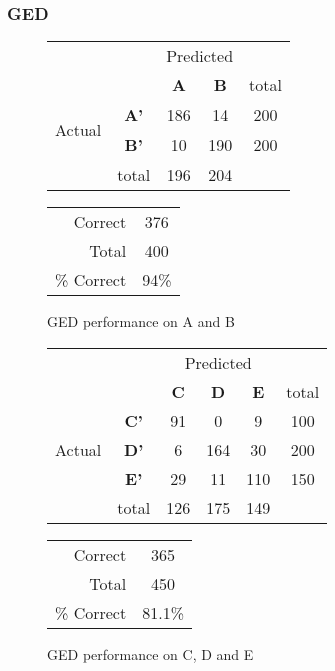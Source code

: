\subsubsection{GED}
\begin{figure}[ht]
\begin{minipage}[b]{0.5\linewidth}
\centering
	\begin{tabular}{ccc|c|c}
	 & &\multicolumn{2}{c}{Predicted} &\\
	  & & \bf{A} &  \bf{B} & total \\
	 \cline{3-5}
	 \multirow{2}{*}{\begin{sideways}Actual\end{sideways}} & \bf{A'}& 186 & 14 & 200 \\
	 \cline{3-5}
	 & \bf{B'}& 10 & 190 & 200 \\
	  \cline{3-5}
	 &total&196&204&\\
	\end{tabular}
\end{minipage}
\hspace{0.5cm}
\begin{minipage}[b]{0.5\linewidth}
	\begin{tabular}{r|c}
	\hline
	Correct& 376\\
	Total& 400\\
	\hline
	\% Correct& 94\%\\
	\hline
	\end{tabular}
\end{minipage}
\vspace{1mm}
\caption{GED performance on A and B}
\end{figure}

\begin{figure}[ht]
\begin{minipage}[b]{0.5\linewidth}
\centering
	\begin{tabular}{ccc|c|c|c}
	 & &\multicolumn{3}{c}{Predicted} &\\
	  & & \bf{C} &  \bf{D} & \bf{E} & total \\
	 \cline{3-5}
	 \multirow{3}{*}{\begin{sideways}Actual\end{sideways}} & \bf{C'}& 91 & 0 & 9 & 100\\
	 \cline{3-6}
	 & \bf{D'}& 6 & 164 & 30 & 200\\
	  \cline{3-6}
	 & \bf{E'}& 29 & 11 & 110 &  150\\
	  \cline{3-6}
	 &total&126&175&149\\
	\end{tabular}
\end{minipage}
\hspace{0.5cm}
\begin{minipage}[b]{0.5\linewidth}
	\begin{tabular}{r|c}
	\hline
	Correct& 365\\
	Total& 450\\
	\hline
	\% Correct& 81.1\%\\
	\hline
	\end{tabular}
\end{minipage}
\vspace{1mm}
\caption{GED performance on C, D and E}
\end{figure}

